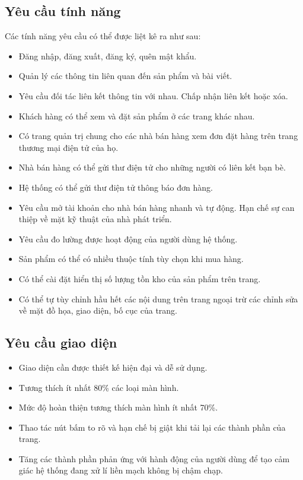 \documentclass[11pt]{report}
\begin{document}
	\subsection{Yêu cầu tính năng}
	Các tính năng yêu cầu có thể được liệt kê ra như sau:
	\begin{itemize}
		\item Đăng nhập, đăng xuất, đăng ký, quên mật khẩu.
		\item Quản lý các thông tin liên quan đến sản phẩm và bài viết.
		\item Yêu cầu đối tác liên kết thông tin với nhau. Chấp nhận liên kết hoặc xóa.
		\item Khách hàng có thể xem và đặt sản phẩm ở các trang khác nhau.
		\item Có trang quản trị chung cho các nhà bán hàng xem đơn đặt hàng trên trang thương mại điện tử của họ.
		\item Nhà bán hàng có thể gửi thư điện tử cho những người có liên kết bạn bè.
		\item Hệ thống có thể gửi thư điện tử thông báo đơn hàng.
		\item Yêu cầu mở tài khoản cho nhà bán hàng nhanh và tự động. Hạn chế sự can thiệp về mặt kỹ thuật của nhà phát triển.
		\item Yêu cầu đo lường được hoạt động của người dùng hệ thống.
		\item Sản phẩm có thể có nhiều thuộc tính tùy chọn khi mua hàng.
		\item Có thể cài đặt hiển thị số lượng tồn kho của sản phẩm trên trang.
		\item Có thể tự tùy chỉnh hầu hết các nội dung trên trang ngoại trừ các chỉnh sửa về mặt đồ họa, giao diện, bố cục của trang.
	\end{itemize}
	\subsection{Yêu cầu giao diện}
	\begin{itemize}
		\item Giao diện cần được thiết kế hiện đại và dễ sử dụng.
		\item Tương thích ít nhất 80\% các loại màn hình.
		\item Mức độ hoàn thiện tương thích màn hình ít nhất 70\%.
		\item Thao tác nút bấm to rõ và hạn chế bị giật khi tải lại các thành phần của trang.
		\item Tăng các thành phần phản ứng với hành động của người dùng để tạo cảm giác hệ thống đang xử lí liền mạch không bị chậm chạp.
	\end{itemize}
\end{document}
